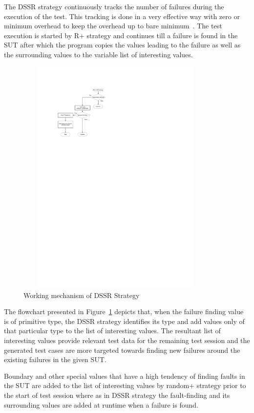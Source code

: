 The DSSR strategy continuously tracks the number of failures during the execution of the test. This tracking is done in a very effective way with zero or minimum overhead to keep the overhead up to bare minimum~\cite{Leitner2009}. The test execution is started by R+ strategy and continues till a failure is found in the SUT after which the program copies the values leading to the failure as well as the surrounding values to the variable list of interesting values. 

\begin{figure}[ht]
\centering
\includegraphics[width=10cm, height=12cm]{DSSR/flowchart1.pdf}
\caption{Working mechanism of DSSR Strategy}
\label{fig:Working_DSSS}
\end{figure}

The flowchart presented in Figure~\ref{fig:Working_DSSS} depicts that, when the failure finding value is of primitive type, the DSSR strategy identifies its type and add values only of that particular type to the list of interesting values. The resultant list of interesting values provide relevant test data for the remaining test session and the generated test cases are more targeted towards finding new failures around the existing failures in the given SUT.

Boundary and other special values that have a high tendency of finding faults in the SUT are added to the list of interesting values by random+ strategy prior to the start of test session where as in DSSR strategy the fault-finding and its surrounding values are added at runtime when a failure is found. 

